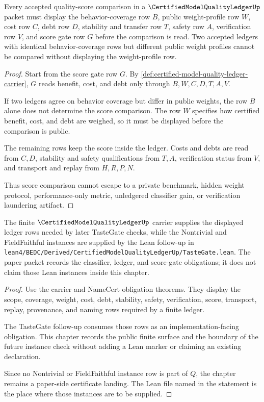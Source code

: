\begin{theorem}
\label{thm:certified-model-quality-ledger-score-nonescape}
Every accepted quality-score comparison in a $\CertifiedModelQualityLedgerUp$ packet must display the behavior-coverage row $B$, public weight-profile row $W$, cost row $C$, debt row $D$, stability and transfer row $T$, safety row $A$, verification row $V$, and score gate row $G$ before the comparison is read. Two accepted ledgers with identical behavior-coverage rows but different public weight profiles cannot be compared without displaying the weight-profile row.
\end{theorem}
\begin{proof}
Start from the score gate row $G$. By \autoref{def:certified-model-quality-ledger-carrier}, $G$ reads benefit, cost, and debt only through $B,W,C,D,T,A,V$.

If two ledgers agree on behavior coverage but differ in public weights, the row $B$ alone does not determine the score comparison. The row $W$ specifies how certified benefit, cost, and debt are weighed, so it must be displayed before the comparison is public.

The remaining rows keep the score inside the ledger. Costs and debts are read from $C,D$, stability and safety qualifications from $T,A$, verification status from $V$, and transport and replay from $H,R,P,N$.

Thus score comparison cannot escape to a private benchmark, hidden weight protocol, performance-only metric, unledgered classifier gain, or verification laundering artifact.
\end{proof}

\begin{theorem}
\label{thm:certified-model-quality-ledger-tastegate-boundary}
The finite $\CertifiedModelQualityLedgerUp$ carrier supplies the displayed ledger rows needed by later TasteGate checks, while the Nontrivial and FieldFaithful instances are supplied by the Lean follow-up in \texttt{lean4/BEDC/Derived/CertifiedModelQualityLedgerUp/TasteGate.lean}. The paper packet records the classifier, ledger, and score-gate obligations; it does not claim those Lean instances inside this chapter.
\end{theorem}
\begin{proof}
Use the carrier and NameCert obligation theorems. They display the scope, coverage, weight, cost, debt, stability, safety, verification, score, transport, replay, provenance, and naming rows required by a finite ledger.

The TasteGate follow-up consumes those rows as an implementation-facing obligation. This chapter records the public finite surface and the boundary of the future instance check without adding a Lean marker or claiming an existing declaration.

Since no Nontrivial or FieldFaithful instance row is part of $Q$, the chapter remains a paper-side certificate landing. The Lean file named in the statement is the place where those instances are to be supplied.
\end{proof}


